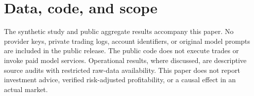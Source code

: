 

\section*{Data, code, and scope}
The synthetic study and public aggregate results accompany this paper. No provider keys, private trading logs, account identifiers, or original model prompts are included in the public release. The public code does not execute trades or invoke paid model services. Operational results, where discussed, are descriptive source audits with restricted raw-data availability. This paper does not report investment advice, verified risk-adjusted profitability, or a causal effect in an actual market.

